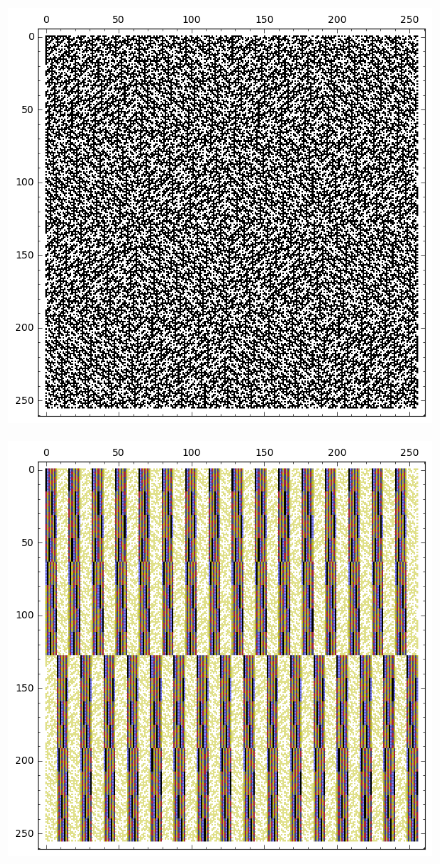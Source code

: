 \documentclass[12pt,a4paper]{article}
\begin{document}
\begin{figure}[!bhpt] %
\centering
\begin{minipage}{.48\textwidth}
  \centering
  \includegraphics[width=.9\linewidth]{../matrix_plot/re8_5_weight_class_matrix.png}
  \label{fig:8_5_weight_class_matrix}
\end{minipage}%
\begin{minipage}{.48\textwidth}
  \centering
  \includegraphics[width=.9\linewidth]{../matrix_plot/re8_5_bent_cayley_graph_index_matrix.png}
  \label{fig:8_5_bent_cayley_graph_index_matrix}
\end{minipage}
\end{figure}
~
\end{document}
